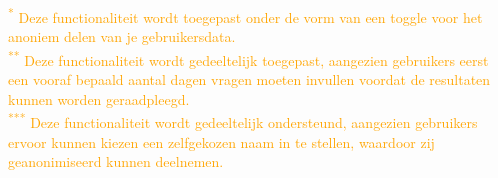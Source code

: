 {\footnotesize{\textcolor{orange}{\textsuperscript{*} Deze functionaliteit wordt toegepast onder de vorm van een toggle voor het anoniem delen van je gebruikersdata.}}} \\
{\footnotesize{\textcolor{orange}{\textsuperscript{**} Deze functionaliteit wordt gedeeltelijk toegepast, aangezien gebruikers eerst een vooraf bepaald aantal dagen vragen moeten invullen voordat de resultaten kunnen worden geraadpleegd.}}} \\
{\footnotesize{\textcolor{orange}{\textsuperscript{***} Deze functionaliteit wordt gedeeltelijk ondersteund, aangezien gebruikers ervoor kunnen kiezen een zelfgekozen naam in te stellen, waardoor zij geanonimiseerd kunnen deelnemen.}}}

\vspace{2em}


